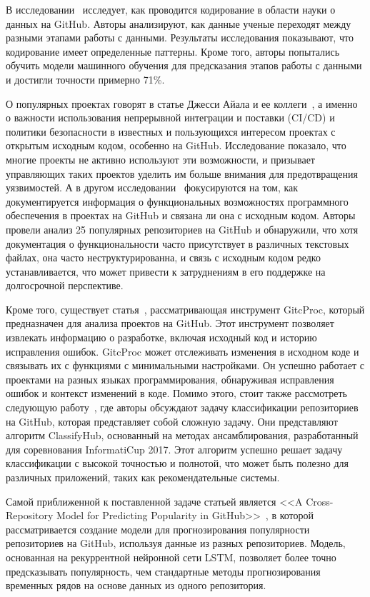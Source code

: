 В исследовании~\cite{RamasamySBB23} исследует, как проводится кодирование в области науки о данных на GitHub. Авторы анализируют, как данные ученые переходят между разными этапами работы с данными. Результаты исследования показывают, что кодирование имеет определенные паттерны. Кроме того, авторы попытались обучить модели машинного обучения для предсказания этапов работы с данными и достигли точности примерно 71\%.

О популярных проектах говорят в статье Джесси Айала и ее коллеги~\cite{AyalaG23}, а именно о важности использования непрерывной интеграции и поставки (CI/CD) и политики безопасности в известных и пользующихся интересом проектах с открытым исходным кодом, особенно на GitHub. Исследование показало, что многие проекты не активно используют эти возможности, и призывает управляющих таких проектов уделить им больше внимания для предотвращения уязвимостей. А в другом исследовании~\cite{PuhlfurssMM22} фокусируются на том, как документируется информация о функциональных возможностях программного обеспечения в проектах на GitHub и связана ли она с исходным кодом. Авторы провели анализ 25 популярных репозиториев на GitHub и обнаружили, что хотя документация о функциональности часто присутствует в различных текстовых файлах, она часто неструктурированна, и связь с исходным кодом редко устанавливается, что может привести к затруднениям в его поддержке на долгосрочной перспективе. 

Кроме того, существует статья~\cite{CasalnuovoSRR17}, рассматривающая инструмент GitcProc, который предназначен для анализа проектов на GitHub. Этот инструмент позволяет извлекать информацию о разработке, включая исходный код и историю исправления ошибок. GitcProc может отслеживать изменения в исходном коде и связывать их с функциями с минимальными настройками. Он успешно работает с проектами на разных языках программирования, обнаруживая исправления ошибок и контекст изменений в коде. Помимо этого, стоит также рассмотреть следующую работу~\cite{SollV17}, где авторы обсуждают задачу классификации репозиториев на GitHub, которая представляет собой сложную задачу. Они представляют алгоритм ClassifyHub, основанный на методах ансамблирования, разработанный для соревнования InformatiCup 2017. Этот алгоритм успешно решает задачу классификации с высокой точностью и полнотой, что может быть полезно для различных приложений, таких как рекомендательные системы.

Самой приближенной к поставленной задаче статьей является <<A Cross-Repository Model for Predicting Popularity in GitHub>>~\cite{abs-1902-05216}, в которой рассматривается создание модели для прогнозирования популярности репозиториев на GitHub, используя данные из разных репозиториев. Модель, основанная на рекуррентной нейронной сети LSTM, позволяет более точно предсказывать популярность, чем стандартные методы прогнозирования временных рядов на основе данных из одного репозитория. 

